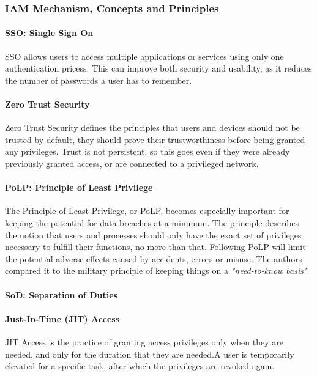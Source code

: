 \subsubsection{IAM Mechanism, Concepts and Principles}
\paragraph{SSO: Single Sign On}
SSO allows users to access multiple applications or services using only one authentication pricess. This can improve both security and usability, as it reduces the number of passwords a user has to remember.

\paragraph{Zero Trust Security}
Zero Trust Security defines the principles that users and devices should not be trusted by default, they should prove their trustworthiness before being granted any privileges. Trust is not persistent, so this goes even if they were already previously granted access, or are connected to a privileged network.

\paragraph{PoLP: Principle of Least Privilege}
The Principle of Least Privilege, or PoLP, becomes especially important for keeping the potential for data breaches at a minimum. The principle describes the notion that users and processes should only have the exact set of privileges necessary to fulfill their functions, no more than that\citep{OGDef-PoLP}. Following PoLP will limit the potential adverse effects caused by accidents, errors or misuse. The authors compared it to the military principle of keeping things on a \textit{"need-to-know basis"}\citep{OGDef-PoLP}.

\paragraph{SoD: Separation of Duties}

\paragraph{Just-In-Time (JIT) Access}
JIT Access is the practice of granting access privileges only when they are needed, and only for the duration that they are needed.A user is temporarily elevated for a specific task, after which the privileges are revoked again.

